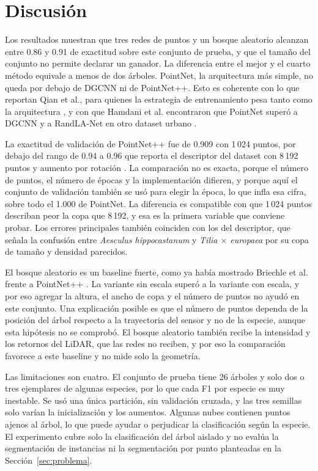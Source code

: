 \documentclass[preprint,12pt]{elsarticle}
\begin{document}
\section{Discusión}
\label{sec:discusion}

Los resultados muestran que tres redes de puntos y un bosque aleatorio alcanzan entre 0.86 y 0.91 de exactitud sobre este conjunto de prueba, y que el tamaño del conjunto no permite declarar un ganador. La diferencia entre el mejor y el cuarto método equivale a menos de dos árboles. PointNet, la arquitectura más simple, no queda por debajo de DGCNN ni de PointNet++. Esto es coherente con lo que reportan Qian et al., para quienes la estrategia de entrenamiento pesa tanto como la arquitectura \cite{qian2022pointnext}, y con que Hamdani et al. encontraron que PointNet superó a DGCNN y a RandLA-Net en otro dataset urbano \cite{hamdani2026classification}.

La exactitud de validación de PointNet++ fue de 0.909 con 1\,024 puntos, por debajo del rango de 0.94 a 0.96 que reporta el descriptor del dataset con 8\,192 puntos y aumento por rotación \cite{hamdani2026urbantree3d}. La comparación no es exacta, porque el número de puntos, el número de épocas y la implementación difieren, y porque aquí el conjunto de validación también se usó para elegir la época, lo que infla esa cifra, sobre todo el 1.000 de PointNet. La diferencia es compatible con que 1\,024 puntos describan peor la copa que 8\,192, y esa es la primera variable que conviene probar. Los errores principales también coinciden con los del descriptor, que señala la confusión entre \textit{Aesculus hippocastanum} y \textit{Tilia $\times$ europaea} por su copa de tamaño y densidad parecidos.

El bosque aleatorio es un baseline fuerte, como ya había mostrado Briechle et al. frente a PointNet++ \cite{briechle2020pointnetpp}. La variante sin escala superó a la variante con escala, y por eso agregar la altura, el ancho de copa y el número de puntos no ayudó en este conjunto. Una explicación posible es que el número de puntos dependa de la posición del árbol respecto a la trayectoria del sensor y no de la especie, aunque esta hipótesis no se comprobó. El bosque aleatorio también recibe la intensidad y los retornos del LiDAR, que las redes no reciben, y por eso la comparación favorece a este baseline y no mide solo la geometría.

Las limitaciones son cuatro. El conjunto de prueba tiene 26 árboles y solo dos o tres ejemplares de algunas especies, por lo que cada F1 por especie es muy inestable. Se usó una única partición, sin validación cruzada, y las tres semillas solo varían la inicialización y los aumentos. Algunas nubes contienen puntos ajenos al árbol, lo que puede ayudar o perjudicar la clasificación según la especie. El experimento cubre solo la clasificación del árbol aislado y no evalúa la segmentación de instancias ni la segmentación por punto planteadas en la Sección~\ref{sec:problema}.
\end{document}
